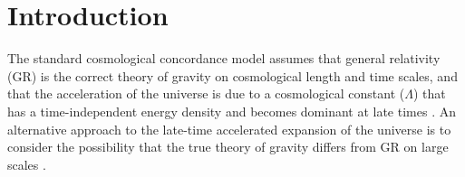 \documentclass[prd,aps,psfig,nofootinbib,nobibnotes,superscriptaddress,preprintnumbers,times]{revtex4-2}\setlength{\topmargin}{-14mm}
\begin{document}
\maketitle

\section{Introduction}
The standard cosmological concordance model assumes that general relativity (GR) is the correct theory of gravity on cosmological length and time scales, and that the acceleration of the universe
is due to a cosmological constant ($\Lambda$) that has a time-independent energy density and becomes dominant at late times \cite{Copeland:2006wr, Peebles:2002gy}. 
An alternative approach to the late-time accelerated expansion of the universe is
to consider the possibility that the true theory of gravity differs from GR on large scales \cite{Clifton:2011jh, Nojiri:2017ncd, Joyce:2014kja, Planck:2015bue}. 
\end{document}
